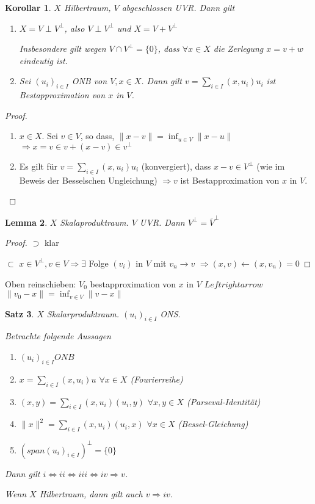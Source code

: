 \documentclass[ngerman]{report}
\theoremstyle{plain}%
\newtheorem{thm}{Satz}[chapter]
\newtheorem{lemma}[thm]{Lemma}
\newtheorem{cor}[thm]{Korollar}
\theoremstyle{definition}%
\theoremstyle{myStyle}
\newcommand{\norm}[1]{\|#1\|}
\newcommand{\df}[1][]{%
	\overset{#1}{\Rightarrow}
}
\newcommand{\aq}{\Leftrightarrow} %
\newcommand{\ff}[3]{(#1_#2)_{#2\in#3}}
\begin{document}
	\begin{cor}
		$X$ Hilbertraum, $V$ abgeschlossen UVR. Dann gilt 
			\begin{enumerate}
				\item $X = V \perp V^\perp$, also $ V\perp V^\perp$ und $X = V + V^\perp$\par
				Insbesondere gilt wegen $V\cap V^\perp = \{0\}$, dass $\forall x\in X$ die Zerlegung $x = v + w$ eindeutig ist.
				\item Sei $\ff{u}{i}{I}$ ONB von $V, x\in X$. Dann gilt 
				$v = \sum_{i\in I} (x,u_i) u_i$ ist Bestapproximation von $x$ in $V$.
			\end{enumerate}
	\end{cor}

	\begin{proof}
		\begin{enumerate}
			\item $x\in X$. Sei $v\in V$, so dass, $\norm{x-v} = \inf_{u\in V}\norm{x-u}$
			$\df x = v \in v+ (x-v) \in v^\perp$
			\item Es gilt für $v = \sum_{i\in I} (x, u_i) u_i$ (konvergiert), dass $x -v \in V^\perp$
			(wie im Beweis der Besselschen Ungleichung)
			$\df v$ ist Bestapproximation von $x$ in $V$.
		\end{enumerate}
	\end{proof}

	\begin{lemma}
		$X$ Skalaproduktraum. $V$ UVR. Dann $V^\perp = \overline{V}^\perp$
	\end{lemma}
	\begin{proof}
		$\supset$ klar \par
		$\subset$ $x\in V^\perp, v\in V \df \exists$ Folge $(v_i)$ in $V$ mit $v_n \to v$
		$\df (x,v) \leftarrow (x,v_n) = 0$
	\end{proof}
 Oben reinschieben: $V_0$ bestapproximation von $x$ in $V$ $Leftrightarrow$ $\norm{v_0 - x} = \inf_{v\in V}\norm{v-x}$

 	\begin{thm}
		$X$ Skalarproduktraum. $\ff{u}{i}{I}$ ONS.\par
		Betrachte folgende Aussagen
			\begin{enumerate}
				\item $\ff{u}{i}{I} ONB$
				\item $x = \sum_{i\in I} (x, u_i)u$ $\forall x\in X$ (Fourierreihe)
				\item $(x,y) = \sum_{i\in I}(x,u_i)(u_i,y)$ $\forall x,y \in X$ (Parseval-Identität)
				\item $\norm{x}^2 = \sum_{i\in I}(x, u_i)(u_i,x)$ $\forall x\in X$ (Bessel-Gleichung)
				\item $(span\ff{u}{i}{I})^\perp = \{0\}$
			\end{enumerate}
			Dann gilt $i \aq ii \aq iii \aq iv \df v$.\par
			Wenn $X$ Hilbertraum, dann gilt auch $v\df iv$.
	\end{thm}	
\end{document}
